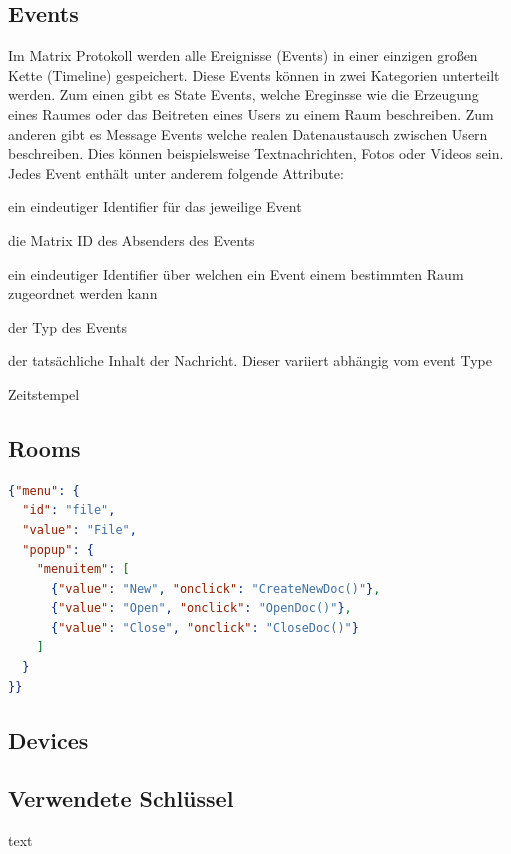     \subsection{Events}\label{sec:events}
    Im Matrix Protokoll werden alle Ereignisse (Events) in einer einzigen großen Kette (Timeline) gespeichert. Diese Events können in zwei Kategorien unterteilt werden. Zum einen gibt es State Events, welche Ereginsse wie die Erzeugung eines Raumes oder das Beitreten eines Users zu einem Raum beschreiben.
    Zum anderen gibt es Message Events welche realen Datenaustausch zwischen Usern beschreiben. Dies können beispielsweise Textnachrichten, Fotos oder Videos sein. Jedes Event enthält unter anderem folgende Attribute:
    \begin{description}[leftmargin=!,labelwidth=3.5cm]
        \item [event\_id] ein eindeutiger Identifier für das jeweilige Event
        \item [sender] die Matrix ID des Absenders des Events
        \item [room\_id] ein eindeutiger Identifier über welchen ein Event einem bestimmten Raum zugeordnet werden kann
        \item [type] der Typ des Events
        \item [content] der tatsächliche Inhalt der Nachricht. Dieser variiert abhängig vom event Type
        \item [origin\_server\_ts] Zeitstempel
    \end{description}

    \subsection{Rooms}


    \begin{lstlisting}[language=json,firstnumber=1]
{"menu": {
  "id": "file",
  "value": "File",
  "popup": {
    "menuitem": [
      {"value": "New", "onclick": "CreateNewDoc()"},
      {"value": "Open", "onclick": "OpenDoc()"},
      {"value": "Close", "onclick": "CloseDoc()"}
    ]
  }
}}
    \end{lstlisting}


    \subsection{Devices}


    \subsection{Verwendete Schlüssel}\label{subsec:verwendete-schlussel}
    text


